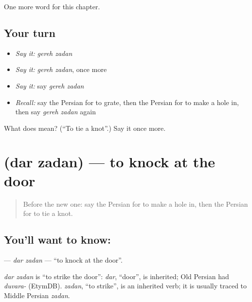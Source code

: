 \begin{grammarlens}[title={What you've built}]
One more word for this chapter.
\end{grammarlens}

\subsection*{Your turn}
\begin{itemize}
\raggedright
  \item \emph{Say it:} \emph{gereh zadan}
  \item \emph{Say it:} \emph{gereh zadan}, once more
  \item \emph{Say it:} say \emph{gereh zadan}
  \item \emph{Recall:} say the Persian for to grate, then the Persian for to make a hole in, then say \emph{gereh zadan} again
\end{itemize}

\begin{tcolorbox}[breakable,colback=teal!4,colframe=teal!35!black,title={Before you move on}]
What does   mean? (\textquotedblleft{}To tie a knot\textquotedblright{}.) Say it once more.
\end{tcolorbox}
\section[\texorpdfstring{\fa{در} \fa{زدن} (dar zadan)}{در زدن (dar zadan)}]{  (dar zadan) — to knock at the door}

\label{lesson:FA-C260-dar-zadan}



\begin{quote}
Before the new one: say the Persian for to make a hole in, then the Persian for to tie a knot.
\end{quote}

\subsection*{You'll want to know:  }
\textbf{ } — \emph{dar zadan} — \textquotedblleft{}to knock at the door\textquotedblright{}.

\begin{cousinweb}
\emph{dar zadan} is \textquotedblleft{}to strike the door\textquotedblright{}: \emph{dar}, \textquotedblleft{}door\textquotedblright{}, is inherited; Old Persian had \emph{duvara-} (EtymDB). \emph{zadan}, \textquotedblleft{}to strike\textquotedblright{}, is an inherited verb; it is usually traced to Middle Persian \emph{zadan}.
\end{cousinweb}

